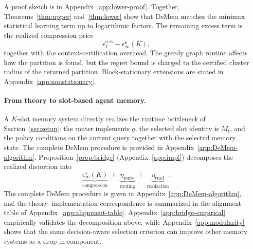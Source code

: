 \documentclass{article}
\theoremstyle{plain}
\theoremstyle{definition}
\theoremstyle{remark}
\newcommand{\eps}{\epsilon}
\begin{document}
\noindent A proof sketch is in Appendix~\ref{app:lower-proof}.
Together, Theorems~\ref{thm:upper} and~\ref{thm:lower} show that
DeMem matches the minimax statistical learning term up to
logarithmic factors. The remaining excess term is the realized compression
price
\[
\bar\eps^{\mathrm{cert}}_T-\eps^\star_\infty(K),
\]
together with the context-certification overhead. The greedy graph routine
affects how the partition is found, but the regret bound is charged to the
certified cluster radius of the returned partition. Block-stationary
extensions are stated in Appendix~\ref{app:nonstationary}.



\vspace{-0.5em}
\paragraph{From theory to slot-based agent memory.}
A $K$-slot memory system directly realizes the runtime bottleneck of
Section~\ref{sec:setup}: the router implements $g$, the selected slot identity
is $M_t$, and the policy conditions on the current query together with the
selected memory state. The complete DeMem procedure is provided in
Appendix~\ref{app:DeMem-algorithm}.
Proposition~\ref{prop:bridge} (Appendix~\ref{app:impl}) decomposes the
realized distortion into
\[
\underbrace{\eps^\star_\infty(K)}_{\text{compression}}
\;+\;
\underbrace{\eta_{\mathrm{route}}}_{\text{routing}}
\;+\;
\underbrace{\eta_{\mathrm{read}}}_{\text{realization}}.
\]
The complete DeMem procedure is given in
Appendix~\ref{app:DeMem-algorithm}, and the theory--implementation
correspondence is summarized in the alignment table of
Appendix~\ref{app:alignment-table}. Appendix~\ref{app:bridge-empirical}
empirically validates the decomposition above, while
Appendix~\ref{app:modularity} shows that the same decision-aware selection
criterion can improve other memory systems as a drop-in component.
\end{document}
